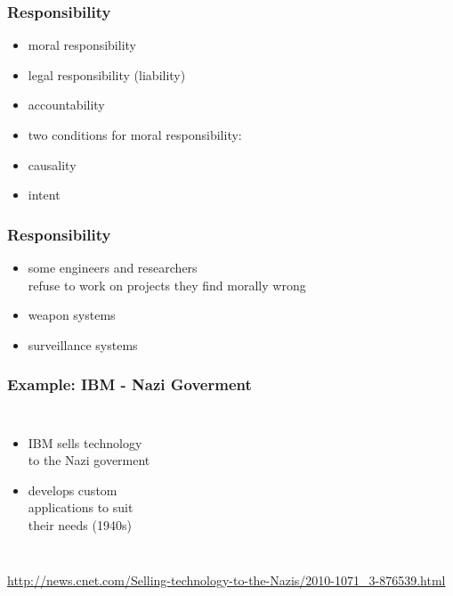 \documentclass[dvipsnames]{beamer}
\theoremstyle{plain}
\begin{document}
\begin{frame}
  \frametitle{Responsibility}

  \begin{itemize}
    \item moral responsibility
    \item legal responsibility (liability)
    \smallskip
    \item accountability

    \pause
    \bigskip
    \item two conditions for moral responsibility:
    \item causality
    \item intent
  \end{itemize}
\end{frame}

\begin{frame}
  \frametitle{Responsibility}

  \begin{itemize}
    \item some engineers and researchers\\
      refuse to work on projects they find morally wrong

    \medskip
    \item weapon systems
    \item surveillance systems
  \end{itemize}
\end{frame}

\begin{frame}
  \frametitle{Example: IBM - Nazi Goverment}

  \begin{columns}

    \begin{itemize}
      \item IBM sells technology\\
        to the Nazi goverment
      \item develops custom\\
        applications to suit\\
        their needs (1940s)
    \end{itemize}
  \end{columns}

  \medskip
  \tiny{\url{http://news.cnet.com/Selling-technology-to-the-Nazis/2010-1071_3-876539.html}}\\
\end{frame}
\end{document}
